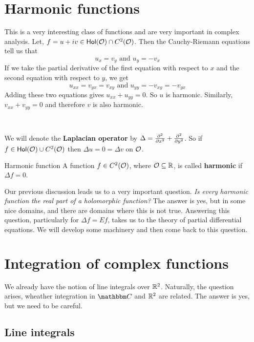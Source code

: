 \documentclass[../ComplexAnalysis_Notes.tex]{subfiles}
\begin{document}
\section{Harmonic functions}
This is a very interesting class of functions and are very important in complex analysis. Let, \(f = u + iv \in \operatorname{\mathsf{Hol}}(\mathcal{O}) \cap C^2(\mathcal{O})\). Then the Cauchy-Riemann equations tell us that
\[ u_x = v_y \text{ and } u_y = -v_x \]
If we take the partial derivative of the first equation with respect to \(x\) and the second equation with respect to \(y\), we get
\[ u_{xx} = v_{yx} = v_{xy} \text{ and } u_{yy} = -v_{xy} = -v_{yx} \]
Adding these two equations gives \(u_{xx} + u_{yy} = 0\). So \(u\) is harmonic. Similarly, \(v_{xx} + v_{yy} = 0\) and therefore \(v\) is also harmonic.

\

We will denote the \textbf{Laplacian operator} by \(\Delta = \pdv[2]{}{x} + \pdv[2]{}{y}\). So if \(f \in \operatorname{\mathsf{Hol}}(\mathcal{O}) \cup C^2(\mathcal{O})\) then \(\Delta u = 0 = \Delta v\) on \(\mathcal{O}\).

\begin{Def}{Harmonic function}{}
  A function \(f \in C^2(\mathcal{O})\), where \(\mathcal{O} \subseteq \mathbb{R}\), is called \textbf{harmonic} if \(\Delta f = 0\).
\end{Def}

Our previous discussion leads us to a very important question. \textit{Is every harmonic function the real part of a holomorphic function?} The answer is yes, but in some nice domains, and there are domains where this is not true. Answering this question, particularly for \(\Delta f = Ef\), takes us to the theory of partial differential equations. We will develop some machinery and then come back to this question.

\section{Integration of complex functions}
We already have the notion of line integrals over \(\mathbb{R}^2\). Naturally, the question arises, wheather integration in \(\C\) and \(\mathbb{R}^2\) are related. The answer is yes, but we need to be careful.

\subsection*{Line integrals}
\end{document}
